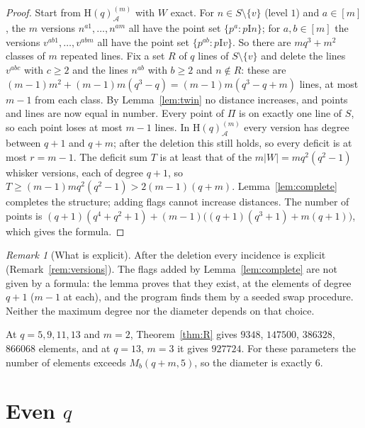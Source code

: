 \documentclass[11pt]{amsart}
\theoremstyle{definition}
\theoremstyle{remark}
\newtheorem{remark}[theorem]{Remark}
\newcommand{\cA}{\mathcal{A}}
\newcommand{\I}{\mathrel{\mathrm{I}}}
\newcommand{\Hq}{\mathrm{H}}
\newcommand{\Dbl}[2]{{#1}^{(#2)}_{\cA}}
\begin{document}
\begin{proof}
Start from $\Dbl{\Hq(q)}{m}$ with $W$ exact. For $n\in S\setminus\{v\}$ (level $1$) and $a\in[m]$, the $m$ versions $n^{a1},\dots,n^{am}$ all have the point set $\{p^a:p\I n\}$; for $a,b\in[m]$ the versions $v^{ab1},\dots,v^{abm}$ all have the point set $\{p^{ab}:p\I v\}$. So there are $mq^3+m^2$ classes of $m$ repeated lines. Fix a set $R$ of $q$ lines of $S\setminus\{v\}$ and delete the lines $v^{abc}$ with $c\ge2$ and the lines $n^{ab}$ with $b\ge2$ and $n\notin R$: these are $(m-1)m^2+(m-1)m(q^3-q)=(m-1)m(q^3-q+m)$ lines, at most $m-1$ from each class. By Lemma~\ref{lem:twin} no distance increases, and points and lines are now equal in number. Every point of $\Pi$ is on exactly one line of $S$, so each point loses at most $m-1$ lines. In $\Dbl{\Hq(q)}{m}$ every version has degree between $q+1$ and $q+m$; after the deletion this still holds, so every deficit is at most $r=m-1$. The deficit sum $T$ is at least that of the $m|W|=mq^2(q^2-1)$ whisker versions, each of degree $q+1$, so $T\ge(m-1)mq^2(q^2-1)>2(m-1)(q+m)$. Lemma~\ref{lem:complete} completes the structure; adding flags cannot increase distances. The number of points is $(q+1)(q^4+q^2+1)+(m-1)\bigl((q+1)(q^3+1)+m(q+1)\bigr)$, which gives the formula.
\end{proof}

\begin{remark}[What is explicit]
After the deletion every incidence is explicit (Remark~\ref{rem:versions}). The flags added by Lemma~\ref{lem:complete} are not given by a formula: the lemma proves that they exist, at the elements of degree $q+1$ ($m-1$ at each), and the program  finds them by a seeded swap procedure. Neither the maximum degree nor the diameter depends on that choice.
\end{remark}

At $q=5,9,11,13$ and $m=2$, Theorem~\ref{thm:R} gives $9348$, $147500$, $386328$, $866068$ elements, and at $q=13$, $m=3$ it gives $927724$. For these parameters the number of elements exceeds $M_b(q+m,5)$, so the diameter is exactly $6$.

\section{Even \texorpdfstring{$q$}{q}}\label{sec:even}
\end{document}
